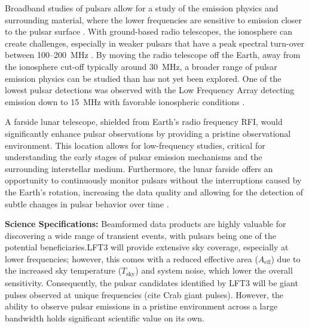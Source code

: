 Broadband studies of pulsars allow for a study of the emission physics and surrounding material, where the lower frequencies are sensitive to emission closer to the pulsar surface \citep{hassall_wide-band_2012}. With ground-based radio telescopes, the ionosphere can create challenges, especially in weaker pulsars that have a peak spectral turn-over between 100--200~MHz \citep{Stappers_2011}. By moving the radio telescope off the Earth, away from the ionosphere cut-off typically around 30~MHz, a broader range of pulsar emission physics can be studied than has not yet been explored. One of the lowest pulsar detections was observed with the Low Frequency Array detecting emission down to 15~MHz with favorable ionospheric conditions \citep{Kondratiev_2012}.


A farside lunar telescope, shielded from Earth’s radio frequency RFI, would significantly enhance pulsar observations by providing a pristine observational environment. This location allows for low-frequency studies, critical for understanding the early stages of pulsar emission mechanisms and the surrounding interstellar medium. Furthermore, the lunar farside offers an opportunity to continuously monitor pulsars without the interruptions caused by the Earth’s rotation, increasing the data quality and allowing for the detection of subtle changes in pulsar behavior over time \citep{jankowski_spectral_2018}.


\textbf{Science Specifications:} Beamformed data products are highly valuable for discovering a wide range of transient events, with pulsars being one of the potential beneficiaries.LFT3 will provide extensive sky coverage, especially at lower frequencies; however, this comes with a reduced effective area (\(A_{\text{eff}}\)) due to the increased sky temperature (\(T_{\text{sky}}\)) and system noise, which lower the overall sensitivity. Consequently, the pulsar candidates identified by LFT3 will be giant pulses observed at unique frequencies (cite Crab giant pulses). However, the ability to observe pulsar emissions in a pristine environment across a large bandwidth holds significant scientific value on its own. 



